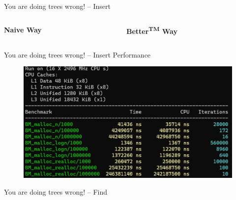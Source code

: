\documentclass{beamer}
\begin{document}
\begin{frame}{You are doing trees wrong! -- Insert}
	\begin{columns}[c]
		\begin{column}[t]{.5\linewidth}{\textbf{Naive Way}}
			
		\end{column}
		\begin{column}[t]{.5\linewidth}{\textbf{Better\textsuperscript{TM} Way}}
			
		\end{column}
	\end{columns}
\end{frame}

\begin{frame}{You are doing trees wrong! -- Insert Performance}
	\begin{figure}
		\centering
		\includegraphics[width=\linewidth]{img/benchmarks.png}
	\end{figure}
\end{frame}

\begin{frame}{You are doing trees wrong! -- Find}
	\begin{columns}[c]
	\end{columns}
\end{frame}
\end{document}
